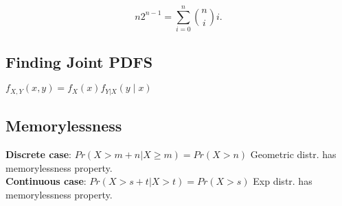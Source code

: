 $$n2^{n-1}=\sum _{i=0}^ n \binom {n}{i}i.$$

\subsection{Finding Joint PDFS}

$f_{X,Y}(x,y)=f_ X(x)f_{Y|X}(y\mid x)$

\subsection{Memorylessness}

\textbf{Discrete case}: $Pr(X > m+n | X \geq m) = Pr(X > n)$ 
Geometric distr. has memorylessness property.\\
\textbf{Continuous  case}: $Pr(X > s+t| X > t) = Pr(X > s)$ 
Exp distr. has memorylessness property.

